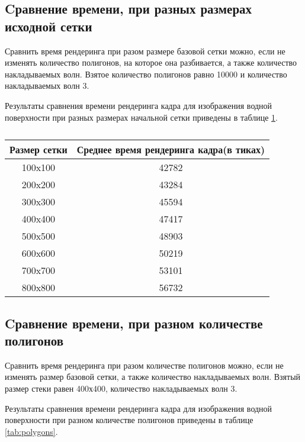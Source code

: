 \subsection{Cравнение времени, при разных размерах исходной сетки}

Сравнить время рендеринга при разом размере базовой сетки можно, если не изменять количество полигонов, на которое она разбивается, а также количество накладываемых волн. Взятое количество полигонов равно 10000 и количество накладываемых волн 3.

Результаты сравнения времени рендеринга кадра для изображения водной поверхности при разных размерах начальной сетки приведены в таблице \ref{tab:noise}.

\begin{table}[h!]
	\caption{}
	\label{tab:noise}
	\begin{center}
		\begin{tabular}{|c | c|} 
			\hline
			Размер сетки & Среднее время рендеринга кадра(в тиках) \\  
			\hline
			100x100 & 42782  \\
			\hline
			200x200 & 43284   \\
			\hline
			300x300 & 45594  \\
			\hline
			400x400 & 47417   \\
			\hline
			500x500 & 48903   \\
			\hline
			600x600 &  50219  \\
			\hline
			700x700 & 53101   \\
			\hline
			800x800 & 56732  \\
			\hline
		\end{tabular}
	\end{center}
\end{table}

\subsection{Cравнение времени, при разном количестве полигонов}

Сравнить время рендеринга при разом количестве полигонов  можно, если не изменять размер базовой сетки, а также количество накладываемых волн. Взятый размер стеки равен 400х400, количество накладываемых волн 3.

Результаты сравнения времени рендеринга кадра для изображения водной поверхности при разном количестве полигонов приведены в таблице \ref{tab:polygons}.

